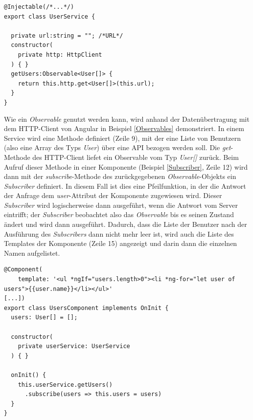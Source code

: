 \begin{lstlisting}[float, floatplacement=h, style=htmlcssjs, caption={Beispiel für die Verwendung von \textit{Observables}}, label={Observables}]
@Injectable(/*...*/)
export class UserService {

  private url:string = ""; /*URL*/
  constructor(
    private http: HttpClient
  ) { }
  getUsers:Observable<User[]> {
    return this.http.get<User[]>(this.url);
  }
}
\end{lstlisting}
Wie ein \textit{Observable} genutzt werden kann, wird anhand der Datenübertragung mit dem \acs{HTTP}-Client von Angular in Beispiel \ref{Observables} demonstriert. In einem Service wird eine Methode definiert (Zeile 9), mit der eine Liste von Benutzern (also eine Array des Typs \textit{User}) über eine \acs{API} bezogen werden soll. Die \textit{get}-Methode des \acs{HTTP}-Client liefet ein Observable vom Typ \textit{User[]} zurück. Beim Aufruf dieser Methode in einer Komponente (Beispiel \ref{Subscriber}, Zeile 12) wird dann mit der \textit{subscribe}-Methode des zurückgegebenen \textit{Observable}-Objekts ein \textit{Subscriber} definiert. In diesem Fall ist dies eine Pfeilfunktion, in der die Antwort der Anfrage dem \textit{user}-Attribut der Komponente zugewiesen wird. Dieser \textit{Subscriber} wird logischerweise dann ausgeführt, wenn die Antwort vom Server eintrifft; der \textit{Subscriber} beobachtet also das \textit{Observable} bis es seinen Zustand ändert und wird dann ausgeführt. Dadurch, dass die Liste der Benutzer nach der Ausführung des \textit{Subscribers} dann nicht mehr leer ist, wird auch die Liste des Templates der Komponente (Zeile 15) angezeigt und darin dann die einzelnen Namen aufgelistet.

\begin{lstlisting}[float, floatplacement=h, style=htmlcssjs, caption={Beispiel für die Initialisierung eines \textit{Subscribers}}, label={Subscriber}]
@Component(
	template: '<ul *ngIf="users.length>0"><li *ng-for="let user of users">{{user.name}}</li></ul>'
[...])
export class UsersComponent implements OnInit {
  users: User[] = [];  
  
  constructor(
    private userService: UserService  
  ) { }
  
  onInit() {
    this.userService.getUsers()
      .subscribe(users => this.users = users)  
  }
}
\end{lstlisting}
